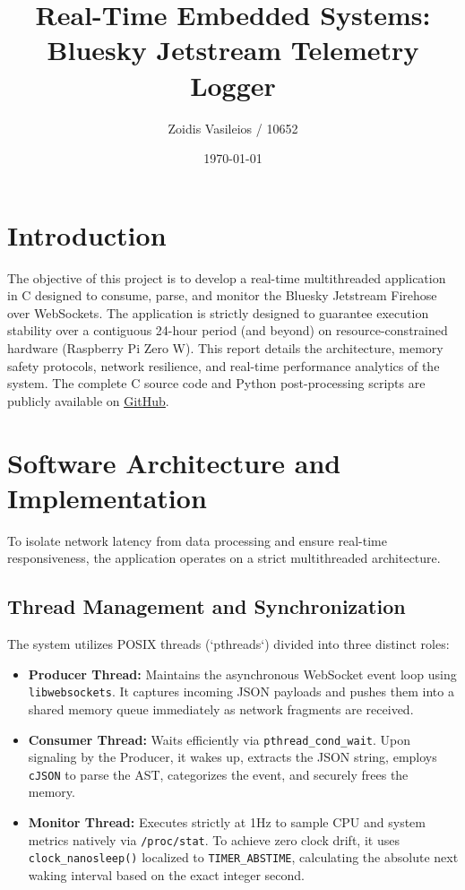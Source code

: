 \documentclass[12pt,a4paper]{article}
\title{Real-Time Embedded Systems: Bluesky Jetstream Telemetry Logger}
\author{Zoidis Vasileios / 10652}
\date{\today}
\begin{document}
\maketitle

\section{Introduction}
The objective of this project is to develop a real-time multithreaded application in C designed to consume, parse, and monitor the Bluesky Jetstream Firehose over WebSockets. The application is strictly designed to guarantee execution stability over a contiguous 24-hour period (and beyond) on resource-constrained hardware (Raspberry Pi Zero W). This report details the architecture, memory safety protocols, network resilience, and real-time performance analytics of the system. The complete C source code and Python post-processing scripts are publicly available on \href{https://github.com/vgzoidis/Real-Time_Embedded_Systems_Projects/tree/main/Final_Project}{\underline{GitHub}}.

\section{Software Architecture and Implementation}
To isolate network latency from data processing and ensure real-time responsiveness, the application operates on a strict multithreaded architecture.

\subsection{Thread Management and Synchronization}
The system utilizes POSIX threads (`pthreads`) divided into three distinct roles:
\begin{itemize}[nosep]
    \item \textbf{Producer Thread:} Maintains the asynchronous WebSocket event loop using \texttt{libwebsockets}. It captures incoming JSON payloads and pushes them into a shared memory queue immediately as network fragments are received.
    \item \textbf{Consumer Thread:} Waits efficiently via \texttt{pthread\_cond\_wait}. Upon signaling by the Producer, it wakes up, extracts the JSON string, employs \texttt{cJSON} to parse the AST, categorizes the event, and securely frees the memory.
    \item \textbf{Monitor Thread:} Executes strictly at 1Hz to sample CPU and system metrics natively via \texttt{/proc/stat}. To achieve zero clock drift, it uses \texttt{clock\_nanosleep()} localized to \texttt{TIMER\_ABSTIME}, calculating the absolute next waking interval based on the exact integer second.
\end{itemize}
\end{document}
